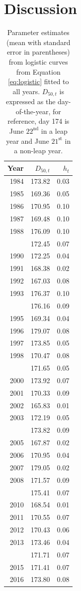 \documentclass[12pt,]{book}
\theoremstyle{definition}
\theoremstyle{definition}
\theoremstyle{definition}
\theoremstyle{remark}
\begin{document}
\section{Discussion}\label{discussion}

\begin{singlespace}

\begin{table}

\caption{\label{tab:rt-ests-table}Parameter estimates (mean with standard error in parentheses) from logistic curves from Equation \ref{eq:logistic} fitted to all years. $D_{50,t}$ is expressed as the day-of-the-year, for reference, day 174 is June $22^{\text{nd}}$ in a leap year and June $21^{\text{st}}$ in a non-leap year.}
\centering
\begin{tabular}[t]{rrr}
\toprule
Year & $D_{50,t}$ & $h_t$\\
\midrule
1984 & 173.82 & 0.03\\
1985 & 169.36 & 0.05\\
1986 & 170.95 & 0.10\\
1987 & 169.48 & 0.10\\
1988 & 176.09 & 0.10\\
\addlinespace
1989 & 172.45 & 0.07\\
1990 & 172.25 & 0.04\\
1991 & 168.38 & 0.02\\
1992 & 167.03 & 0.08\\
1993 & 176.37 & 0.10\\
\addlinespace
1994 & 176.16 & 0.09\\
1995 & 169.34 & 0.04\\
1996 & 179.07 & 0.08\\
1997 & 173.85 & 0.05\\
1998 & 170.47 & 0.08\\
\addlinespace
1999 & 171.65 & 0.05\\
2000 & 173.92 & 0.07\\
2001 & 170.33 & 0.09\\
2002 & 165.83 & 0.01\\
2003 & 172.19 & 0.05\\
\addlinespace
2004 & 173.82 & 0.09\\
2005 & 167.87 & 0.02\\
2006 & 170.95 & 0.04\\
2007 & 179.05 & 0.02\\
2008 & 171.57 & 0.09\\
\addlinespace
2009 & 175.41 & 0.07\\
2010 & 168.54 & 0.01\\
2011 & 170.55 & 0.07\\
2012 & 170.43 & 0.06\\
2013 & 173.46 & 0.04\\
\addlinespace
2014 & 171.71 & 0.07\\
2015 & 171.41 & 0.07\\
2016 & 173.80 & 0.08\\
\bottomrule
\end{tabular}
\end{table}

\end{singlespace}
\end{document}
